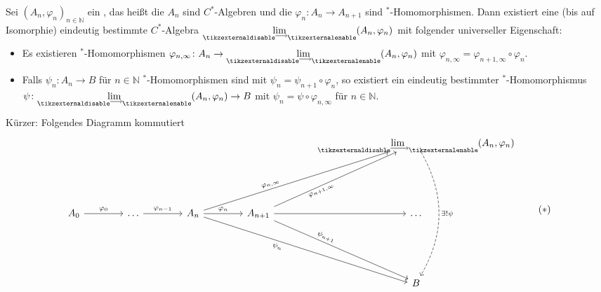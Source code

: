 \begin{satz}[{name=[Limes von C*-Algebren]}]
	Sei $(A_n,\varphi_n)_{n \in \mathbb{N}}$ ein , das heißt die $A_n$ sind $C^*$-Algebren und die $\varphi_n \colon A_n \to A_{n+1}$ sind $^*$-Homomorphismen.
	Dann existiert eine (bis auf Isomorphie) eindeutig bestimmte $C^*$-Algebra $\Dlim(A_n,\varphi_n)$ mit folgender universeller Eigenschaft:
	\begin{itemize}
		\item Es existieren $^*$-Homomorphismen $\varphi_{n,\infty} \colon A_n \to \Dlim(A_n,\varphi_n)$ mit $\varphi_{n,\infty} = \varphi_{n+1,\infty} \circ \varphi_{n}$.
		\item Falls $\psi_n \colon A_n \to B$ für $n \in \mathbb{N}$ $^*$-Homomorphismen sind mit $\psi_n = \psi_{n+1} \circ \varphi_n$, so existiert ein eindeutig bestimmter $^*$-Homomorphismus $\psi \colon \Dlim(A_n,\varphi_n) \to B$ mit $\psi_n = \psi \circ \varphi_{n,\infty}$ für $n \in \mathbb{N}$.
	\end{itemize}
	Kürzer: Folgendes Diagramm kommutiert
	\begin{equation}
		\begin{tikzcd}[column sep=4em,row sep=5.5em,arrows={sloped,pos=.37}]
			& & & & \displaystyle \Dlim(A_n,\varphi_n) \ar[dd,"\exists! \psi",dashed,sloped=false,pos=.5, bend left] \\
			A_0 \rar["\varphi_0",pos=.5]  & \ldots  \rar["\varphi_{n-1}",pos=.5] %
			& A_n \rar["\varphi_n",pos=.5] \ar[urr,"\varphi_{n,\infty}"] \ar[drr,"\psi_n"',end anchor={[yshift=-0.3ex]}] 
			& A_{n+1} \rar \ar[ur,"\varphi_{n+1,\infty}"'] \ar[dr,"\psi_{n+1}",end anchor={[yshift=0.3ex]}] 
			& \ldots \\
			& & & &  B
		\end{tikzcd} \label{eq:413} \tag{$*$}
	\end{equation}
\end{satz}
